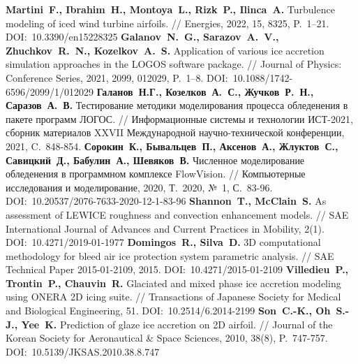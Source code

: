 \begin{thebibliography}{99}
\textbf{Martini~F., Ibrahim~H., Montoya~L., Rizk~P., Ilinca~A.} Turbulence modeling of iced wind turbine airfoils. // Energies, 2022, 15, 8325, P.~1–21. DOI:~10.3390/en15228325
\textbf{Galanov~N.~G., Sarazov~A.~V., Zhuchkov~R.~N., Kozelkov~A.~S.} Application of various ice accretion simulation approaches in the LOGOS software package. // Journal of Physics: Conference Series, 2021, 2099, 012029, P.~1–8. DOI:~10.1088/1742-6596/2099/1/012029
\textbf{Галанов~Н.Г., Козелков~А.~С., Жучков~Р.~Н., Саразов~А.~В.} Тестирование методики моделирования процесса обледенения в пакете программ ЛОГОС. // Информационные системы и технологии ИСТ-2021, сборник материалов XXVII Международной научно-технической конференции, 2021, C.~848-854.
\textbf{Сорокин~К., Бывальцев~П., Аксенов~А., Жлуктов~С., Савицкий~Д., Бабулин~А., Шевяков~В.} Численное моделирование обледенения в программном комплексе FlowVision. // Компьютерные исследования и моделирование, 2020, Т.~2020, №~1, С.~83-96. DOI:~10.20537/2076-7633-2020-12-1-83-96
\textbf{Shannon~T., McClain~S.} As assessment of LEWICE roughness and convection enhancement models. // SAE International Journal of Advances and Current Practices in Mobility, 2(1). DOI:~10.4271/2019-01-1977
\textbf{Domingos~R., Silva~D.} 3D computational methodology for bleed air ice protection system parametric analysis. // SAE Technical Paper 2015-01-2109, 2015. DOI:~10.4271/2015-01-2109
\textbf{Villedieu~P., Trontin~P., Chauvin~R.} Glaciated and mixed phase ice accretion modeling using ONERA 2D icing suite. // Transactions of Japanese Society for Medical and Biological Engineering, 51. DOI:~10.2514/6.2014-2199
\textbf{Son~C.-K., Oh~S.-J., Yee~K.} Prediction of glaze ice accretion on 2D airfoil. // Journal of the Korean Society for Aeronautical \& Space Sciences, 2010, 38(8), P.~747-757. DOI:~10.5139/JKSAS.2010.38.8.747


\end{thebibliography}

